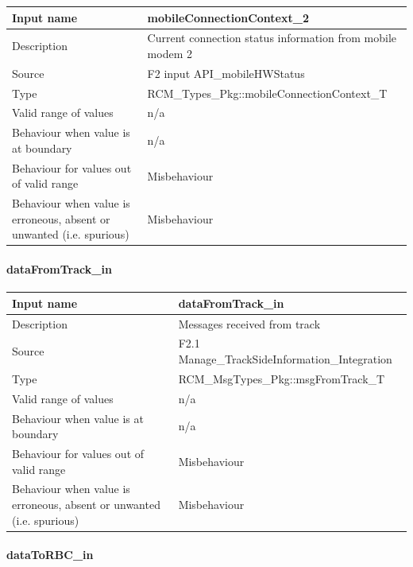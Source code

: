 \begin{longtable}{p{}p{}}
	\toprule
	Input name				& mobileConnectionContext\_2 \\
	\midrule
	Description				& Current connection status information from mobile modem 2 \\
	\midrule
	Source					& F2 input API\_mobileHWStatus \\ 
	\midrule
	Type					& RCM\_Types\_Pkg::mobileConnectionContext\_T \\
	\midrule
	Valid range of values	& n/a \\
	\midrule
	Behaviour when value is at boundary	& n/a \\
	\midrule
	Behaviour for values out of valid range	& Misbehaviour \\
	\midrule
	Behaviour when value is erroneous, absent or unwanted (i.e. spurious) & Misbehaviour \\
	\bottomrule
\end{longtable}

\paragraph{dataFromTrack\_in}

\begin{longtable}{p{}p{}}
	\toprule
	Input name				& dataFromTrack\_in \\
	\midrule
	Description				& Messages received from track \\
	\midrule
	Source					& F2.1 Manage\_TrackSideInformation\_Integration \\ 
	\midrule
	Type					& RCM\_MsgTypes\_Pkg::msgFromTrack\_T \\
	\midrule
	Valid range of values	& n/a \\
	\midrule
	Behaviour when value is at boundary	& n/a \\
	\midrule
	Behaviour for values out of valid range	& Misbehaviour \\
	\midrule
	Behaviour when value is erroneous, absent or unwanted (i.e. spurious) & Misbehaviour \\
	\bottomrule
\end{longtable}

\paragraph{dataToRBC\_in}

